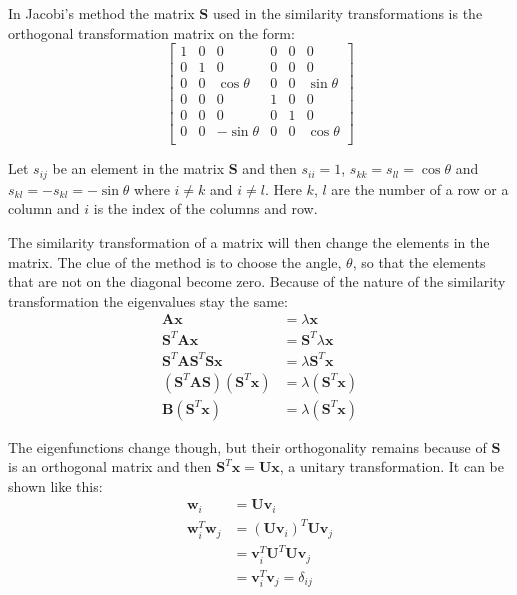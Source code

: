 In Jacobi's method the  matrix $\textbf{S}$ used in the similarity transformations is the orthogonal transformation matrix on the form:
\[
\begin{bmatrix}
1 & 0 & 0 & 0 & 0 & 0 \\
0 & 1 & 0 & 0 & 0 & 0 \\
0 & 0 & \cos \theta & 0 & 0 & \sin \theta\\
0 & 0 & 0 & 1 & 0 & 0 \\
0 & 0 & 0 & 0 & 1 & 0 \\
0 & 0 & -\sin \theta & 0 & 0 & \cos \theta\\
\end{bmatrix}
\]

Let $s_{ij}$ be an element in the matrix $\textbf{S}$ and then $s_{ii} = 1$, $s_{kk} = s_{ll} = \cos \theta$ and $s_{kl} = -s_{kl} = - \sin \theta$ where $ i \neq k$ and $i \neq l$. Here $k$, $l$ are the number of a row or a column and $i$ is the index of the columns and row.  

The similarity transformation of a matrix will then change the elements in the matrix. The clue of the method is to choose the angle, $\theta$, so that the elements that are not on the diagonal become zero. Because of the nature of the similarity transformation the eigenvalues stay the same:
\begin{align*}
\textbf{A}\textbf{x} &= \lambda\textbf{x}\\
\textbf{S}^T\textbf{A}\textbf{x} &= \textbf{S}^T\lambda\textbf{x}\\
\textbf{S}^T\textbf{A}\textbf{S}^T\textbf{S}\textbf{x} &= \lambda\textbf{S}^T\textbf{x}\\
(\textbf{S}^T\textbf{A}\textbf{S})(\textbf{S}^T\textbf{x}) &= \lambda(\textbf{S}^T\textbf{x})\\
\textbf{B}(\textbf{S}^T\textbf{x}) &= \lambda(\textbf{S}^T\textbf{x})
\end{align*}

The eigenfunctions change though, but their orthogonality remains because of $\textbf{S}$ is an orthogonal matrix and then $\textbf{S}^T\textbf{x} = \textbf{U}\textbf{x}$, a unitary transformation. It can be shown like this:
\begin{align*}
	\textbf{w}_i &= \textbf{Uv}_i\\
	\textbf{w}_i^T\textbf{w}_j &= ( \textbf{Uv}_i)^T \textbf{Uv}_j\\
	&= \textbf{v}_i^T\textbf{U}^T\textbf{Uv}_j\\
	&= \textbf{v}_i^T\textbf{v}_j = \delta_{ij}
\end{align*} 

